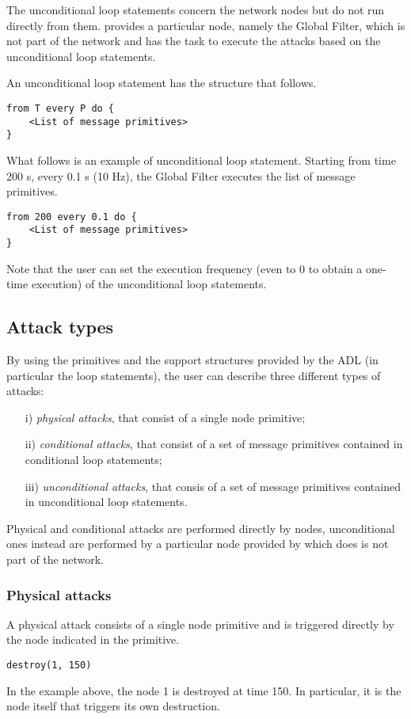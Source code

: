 The unconditional loop statements concern the network nodes but do not run directly from them. \asf provides a particular node, namely the Global Filter, which is not part of the network and has the task to execute the attacks based on the unconditional loop statements.

An unconditional loop statement has the structure that follows.
%
\begin{lstlisting}[language={adl}]
from T every P do { 
    <List of message primitives>
}
\end{lstlisting}
%
What follows is an example of unconditional loop statement. Starting from time 200 s, every 0.1 s (10 Hz), the Global Filter executes the list of message primitives.
%
\begin{lstlisting}[language={adl}]
from 200 every 0.1 do {
    <List of message primitives>
}
\end{lstlisting}

Note that the user can set the execution frequency (even to 0 to obtain a one-time execution) of the unconditional loop statements.



\subsection{Attack types}
\label{ss:attacktypes}
By using the primitives and the support structures provided by the ADL (in particular the loop statements), the user can describe three different types of attacks:
%
\begin{itemize}
\item [i)] \emph{physical attacks}, that consist of a single node primitive;
\item [ii)] \emph{conditional attacks}, that consist of a set of message primitives contained in conditional loop statements;
\item [iii)] \emph{unconditional attacks}, that consis of a set of message primitives contained in unconditional loop statements.
\end{itemize}
%
Physical and conditional attacks are performed directly by nodes, unconditional ones instead are performed by a particular node provided by \asf which does is not part of the network.

\subsubsection{Physical attacks}
A physical attack consists of a single node primitive and is triggered directly by the node indicated in the primitive.
%
\begin{lstlisting}[language={adl}]
destroy(1, 150)
\end{lstlisting}
%
In the example above, the node 1 is destroyed at time 150. In particular, it is the node itself that triggers its own destruction.

